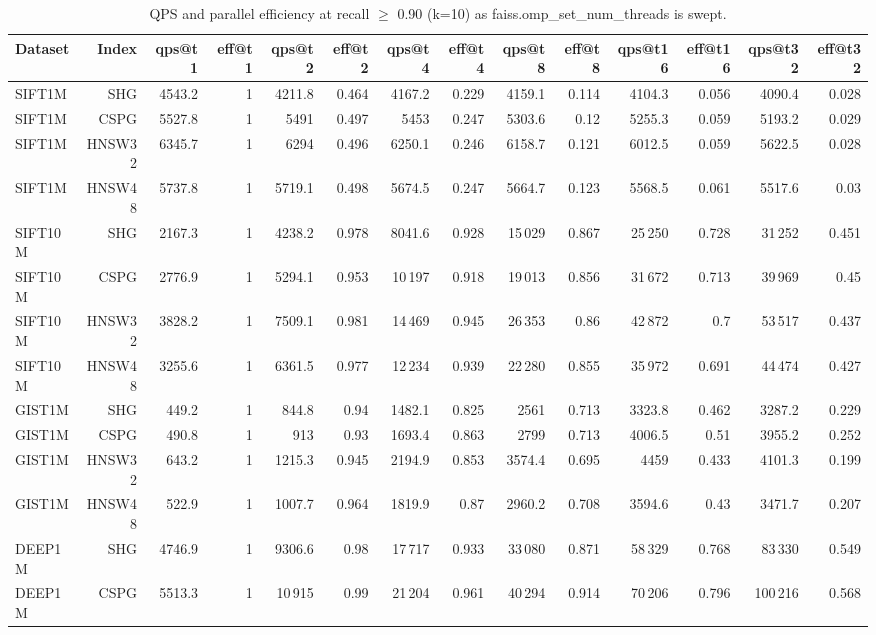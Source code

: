 \begin{table}[t]
\centering
\small
\caption{QPS and parallel efficiency at recall $\geq$ 0.90 (k=10) as faiss.omp\_set\_num\_threads is swept.}
\label{tab:thread-scaling-r90}
\begin{tabular}{lrrrrrrrrrrrrr}
\toprule
Dataset & Index & qps@t1 & eff@t1 & qps@t2 & eff@t2 & qps@t4 & eff@t4 & qps@t8 & eff@t8 & qps@t16 & eff@t16 & qps@t32 & eff@t32 \\
\midrule
SIFT1M & SHG & 4543.2 & 1 & 4211.8 & 0.464 & 4167.2 & 0.229 & 4159.1 & 0.114 & 4104.3 & 0.056 & 4090.4 & 0.028 \\
SIFT1M & CSPG & 5527.8 & 1 & 5491 & 0.497 & 5453 & 0.247 & 5303.6 & 0.12 & 5255.3 & 0.059 & 5193.2 & 0.029 \\
SIFT1M & HNSW32 & 6345.7 & 1 & 6294 & 0.496 & 6250.1 & 0.246 & 6158.7 & 0.121 & 6012.5 & 0.059 & 5622.5 & 0.028 \\
SIFT1M & HNSW48 & 5737.8 & 1 & 5719.1 & 0.498 & 5674.5 & 0.247 & 5664.7 & 0.123 & 5568.5 & 0.061 & 5517.6 & 0.03 \\
SIFT10M & SHG & 2167.3 & 1 & 4238.2 & 0.978 & 8041.6 & 0.928 & 15\,029 & 0.867 & 25\,250 & 0.728 & 31\,252 & 0.451 \\
SIFT10M & CSPG & 2776.9 & 1 & 5294.1 & 0.953 & 10\,197 & 0.918 & 19\,013 & 0.856 & 31\,672 & 0.713 & 39\,969 & 0.45 \\
SIFT10M & HNSW32 & 3828.2 & 1 & 7509.1 & 0.981 & 14\,469 & 0.945 & 26\,353 & 0.86 & 42\,872 & 0.7 & 53\,517 & 0.437 \\
SIFT10M & HNSW48 & 3255.6 & 1 & 6361.5 & 0.977 & 12\,234 & 0.939 & 22\,280 & 0.855 & 35\,972 & 0.691 & 44\,474 & 0.427 \\
GIST1M & SHG & 449.2 & 1 & 844.8 & 0.94 & 1482.1 & 0.825 & 2561 & 0.713 & 3323.8 & 0.462 & 3287.2 & 0.229 \\
GIST1M & CSPG & 490.8 & 1 & 913 & 0.93 & 1693.4 & 0.863 & 2799 & 0.713 & 4006.5 & 0.51 & 3955.2 & 0.252 \\
GIST1M & HNSW32 & 643.2 & 1 & 1215.3 & 0.945 & 2194.9 & 0.853 & 3574.4 & 0.695 & 4459 & 0.433 & 4101.3 & 0.199 \\
GIST1M & HNSW48 & 522.9 & 1 & 1007.7 & 0.964 & 1819.9 & 0.87 & 2960.2 & 0.708 & 3594.6 & 0.43 & 3471.7 & 0.207 \\
DEEP1M & SHG & 4746.9 & 1 & 9306.6 & 0.98 & 17\,717 & 0.933 & 33\,080 & 0.871 & 58\,329 & 0.768 & 83\,330 & 0.549 \\
DEEP1M & CSPG & 5513.3 & 1 & 10\,915 & 0.99 & 21\,204 & 0.961 & 40\,294 & 0.914 & 70\,206 & 0.796 & 100\,216 & 0.568 \\

\end{tabular}
\end{table}
